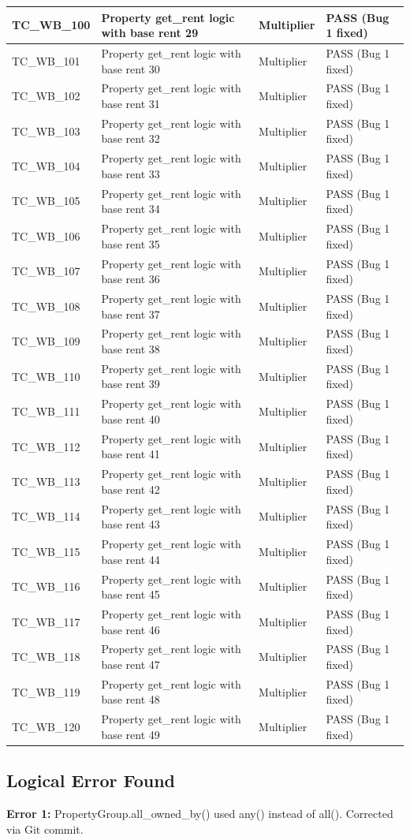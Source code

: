 \documentclass{article}
\begin{document}
\begin{longtable}{|p{2cm}|p{8cm}|p{3cm}|p{2cm}|}
\hline
TC\_WB\_100 & Property get\_rent logic with base rent 29 & Multiplier & PASS (Bug 1 fixed) \\
\hline
TC\_WB\_101 & Property get\_rent logic with base rent 30 & Multiplier & PASS (Bug 1 fixed) \\
\hline
TC\_WB\_102 & Property get\_rent logic with base rent 31 & Multiplier & PASS (Bug 1 fixed) \\
\hline
TC\_WB\_103 & Property get\_rent logic with base rent 32 & Multiplier & PASS (Bug 1 fixed) \\
\hline
TC\_WB\_104 & Property get\_rent logic with base rent 33 & Multiplier & PASS (Bug 1 fixed) \\
\hline
TC\_WB\_105 & Property get\_rent logic with base rent 34 & Multiplier & PASS (Bug 1 fixed) \\
\hline
TC\_WB\_106 & Property get\_rent logic with base rent 35 & Multiplier & PASS (Bug 1 fixed) \\
\hline
TC\_WB\_107 & Property get\_rent logic with base rent 36 & Multiplier & PASS (Bug 1 fixed) \\
\hline
TC\_WB\_108 & Property get\_rent logic with base rent 37 & Multiplier & PASS (Bug 1 fixed) \\
\hline
TC\_WB\_109 & Property get\_rent logic with base rent 38 & Multiplier & PASS (Bug 1 fixed) \\
\hline
TC\_WB\_110 & Property get\_rent logic with base rent 39 & Multiplier & PASS (Bug 1 fixed) \\
\hline
TC\_WB\_111 & Property get\_rent logic with base rent 40 & Multiplier & PASS (Bug 1 fixed) \\
\hline
TC\_WB\_112 & Property get\_rent logic with base rent 41 & Multiplier & PASS (Bug 1 fixed) \\
\hline
TC\_WB\_113 & Property get\_rent logic with base rent 42 & Multiplier & PASS (Bug 1 fixed) \\
\hline
TC\_WB\_114 & Property get\_rent logic with base rent 43 & Multiplier & PASS (Bug 1 fixed) \\
\hline
TC\_WB\_115 & Property get\_rent logic with base rent 44 & Multiplier & PASS (Bug 1 fixed) \\
\hline
TC\_WB\_116 & Property get\_rent logic with base rent 45 & Multiplier & PASS (Bug 1 fixed) \\
\hline
TC\_WB\_117 & Property get\_rent logic with base rent 46 & Multiplier & PASS (Bug 1 fixed) \\
\hline
TC\_WB\_118 & Property get\_rent logic with base rent 47 & Multiplier & PASS (Bug 1 fixed) \\
\hline
TC\_WB\_119 & Property get\_rent logic with base rent 48 & Multiplier & PASS (Bug 1 fixed) \\
\hline
TC\_WB\_120 & Property get\_rent logic with base rent 49 & Multiplier & PASS (Bug 1 fixed) \\
\hline
\end{longtable}

\subsection*{Logical Error Found}
\textbf{Error 1:} PropertyGroup.all\_owned\_by() used any() instead of all(). Corrected via Git commit.
\end{document}
